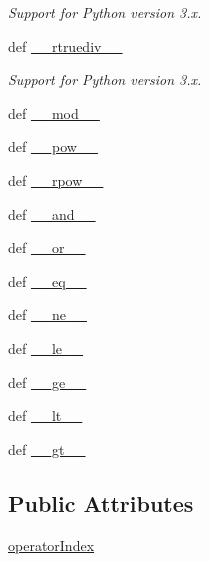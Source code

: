 \begin{DoxyCompactItemize}
\begin{DoxyCompactList}\small\item\em Support for Python version 3.\+x. \end{DoxyCompactList}\item 
def \hyperlink{classbio__expression_1_1_expression_acd7c28acd17fd83b7683ca251c2090e5}{\+\_\+\+\_\+rtruediv\+\_\+\+\_\+}
\begin{DoxyCompactList}\small\item\em Support for Python version 3.\+x. \end{DoxyCompactList}\item 
def \hyperlink{classbio__expression_1_1_expression_a05c3e15662311e47b2292b815249c1c2}{\+\_\+\+\_\+mod\+\_\+\+\_\+}
\item 
def \hyperlink{classbio__expression_1_1_expression_a510dc4ad262b4c299dd072184a0380a4}{\+\_\+\+\_\+pow\+\_\+\+\_\+}
\item 
def \hyperlink{classbio__expression_1_1_expression_af987b6c23488677b13fde246a7427707}{\+\_\+\+\_\+rpow\+\_\+\+\_\+}
\item 
def \hyperlink{classbio__expression_1_1_expression_ad3a7dcee2b149d1ff124fcd2f8cadbed}{\+\_\+\+\_\+and\+\_\+\+\_\+}
\item 
def \hyperlink{classbio__expression_1_1_expression_a7be353cc11c64f3d3b702debd4ac8426}{\+\_\+\+\_\+or\+\_\+\+\_\+}
\item 
def \hyperlink{classbio__expression_1_1_expression_adf09a29f2ac0c1b1869ff935f2c6612e}{\+\_\+\+\_\+eq\+\_\+\+\_\+}
\item 
def \hyperlink{classbio__expression_1_1_expression_a8bdaef5f07950ef3270b7943b1114d37}{\+\_\+\+\_\+ne\+\_\+\+\_\+}
\item 
def \hyperlink{classbio__expression_1_1_expression_a0720666ee199a687e8c5cf884c9dde17}{\+\_\+\+\_\+le\+\_\+\+\_\+}
\item 
def \hyperlink{classbio__expression_1_1_expression_a1e366f4536908dd89478561ceffebf39}{\+\_\+\+\_\+ge\+\_\+\+\_\+}
\item 
def \hyperlink{classbio__expression_1_1_expression_ad2032a2516eab7f683c913e94d02d929}{\+\_\+\+\_\+lt\+\_\+\+\_\+}
\item 
def \hyperlink{classbio__expression_1_1_expression_a99ebd247626cd3c0a0246a4b9327783e}{\+\_\+\+\_\+gt\+\_\+\+\_\+}
\end{DoxyCompactItemize}
\subsection*{Public Attributes}
\begin{DoxyCompactItemize}
\item 
\hyperlink{classbio__expression_1_1_expression_a52a16cb6e8ba6382b354164c41da65ea}{operator\+Index}
\end{DoxyCompactItemize}


